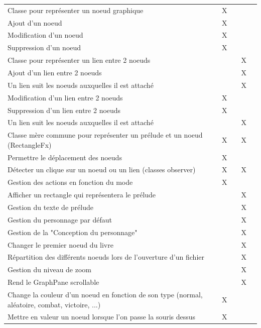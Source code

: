 \begin{centering}
\begin{longtable}{|p{8cm}|c|c|c|c|}
				\rowcolor{lightgray} \multicolumn{5}{|c|}{ \textbf{Zone d'édition}}\\
				\hline
				Classe pour représenter un noeud graphique & X & & & \\
				\hline
				Ajout d'un noeud & X & & & \\
				\hline
				Modification d'un noeud & X & & & \\
				\hline
				Suppression d'un noeud & X & & & \\
				\hline
				Classe pour représenter un lien entre 2 noeuds & & & X & \\
				\hline
				Ajout d'un lien entre 2 noeuds & & & X & \\
				\hline
				Un lien suit les noeuds auxquelles il est attaché & & & X & \\
				\hline
				Modification d'un lien entre 2 noeuds & X & & & \\
				\hline
				Suppression d'un lien entre 2 noeuds & X & & & \\
				\hline
				Un lien suit les noeuds auxquelles il est attaché & & & X & \\
				\hline
				Classe mère commune pour représenter un prélude et un noeud (RectangleFx) & X & & X & \\
				\hline
				Permettre le déplacement des noeuds & X & & & \\
				\hline
				Détecter un clique sur un noeud ou un lien (classes observer) & X & & X & \\
				\hline
				Gestion des actions en fonction du mode & X & & & \\
				\hline
				Afficher un rectangle qui représentera le prélude & & & X & \\
				\hline
				Gestion du texte de prélude & & & X & \\
				\hline
				Gestion du personnage par défaut & & & X & \\
				\hline
				Gestion de la "Conception du personnage" & & & X & \\
				\hline
				Changer le premier noeud du livre & & & X & \\
				\hline
				Répartition des différents noeuds lors de l'ouverture d'un fichier & & & X & \\
				\hline
				Gestion du niveau de zoom & & & X & \\
				\hline
				Rend le GraphPane scrollable & & & X & \\
				\hline
				Change la couleur d'un noeud en fonction de son type (normal, aléatoire, combat, victoire, ...) & X & & & \\
				\hline
				Mettre en valeur un noeud lorsque l'on passe la souris dessus & X & & & \\
				\hline


\end{longtable}
\end{centering}
